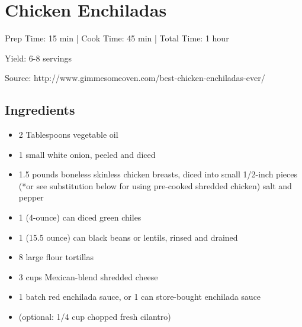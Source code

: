 \section{Chicken Enchiladas}

\begin{center}
Prep Time: 15 min |
Cook Time: 45 min |
Total Time: 1 hour

\noindent Yield: 6-8 servings

\vspace{1em}

Source: http://www.gimmesomeoven.com/best-chicken-enchiladas-ever/
\end{center}

\subsection{Ingredients}
\begin{multicols}{2}
\begin{itemize}
    \item 2 Tablespoons vegetable oil
    \item 1 small white onion, peeled and diced
    \item 1.5 pounds boneless skinless chicken breasts, diced into small 1/2-inch pieces (*or see substitution below for using pre-cooked shredded chicken) salt and pepper
    \item 1 (4-ounce) can diced green chiles
    \item 1 (15.5 ounce) can black beans or lentils, rinsed and drained
    \item 8 large flour tortillas
    \item 3 cups Mexican-blend shredded cheese
    \item 1 batch red enchilada sauce, or 1 can store-bought enchilada sauce
    \item (optional: 1/4 cup chopped fresh cilantro)
\end{itemize}
\end{multicols}

